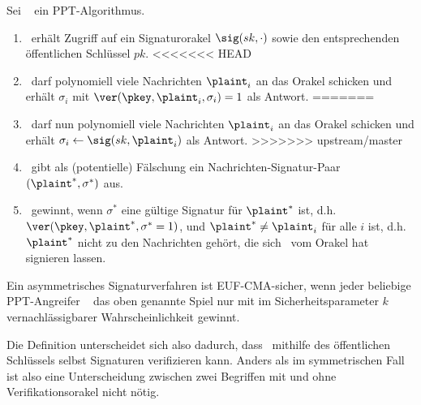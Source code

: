 \begin{definition}
Sei \A~ ein PPT-Algorithmus.
\begin{enumerate}
\item \A~erhält Zugriff auf ein Signaturorakel $\sig(sk, \cdot)$ sowie den
  entsprechenden öffentlichen Schlüssel $pk$.
<<<<<<< HEAD
\item \A~darf polynomiell viele Nachrichten $\plaint_i$ an das
  Orakel schicken und erhält $\sigma_i$ mit $\ver(\pkey, \plaint_i, \sigma_i)=1$ als Antwort.
=======
\item \A~darf nun polynomiell viele Nachrichten $\plaint_i$ an das
  Orakel schicken und erhält $\sigma_i \leftarrow \sig(sk, \plaint_i)$ als Antwort.
>>>>>>> upstream/master
\item \A~gibt als (potentielle) Fälschung ein Nachrichten-Signatur-Paar
  $(\plaint^*,\sigma^*)$ aus.
\item \A~gewinnt, wenn $\sigma^*$ eine gültige Signatur für
  $\plaint^*$ ist, d.h. $\ver(\pkey, \plaint^*, \sigma^* = 1)$, und $\plaint^*
  \neq \plaint_i$ für alle $i$ ist, d.h. $\plaint^*$ nicht zu den
  Nachrichten gehört, die sich \A~vom Orakel hat signieren lassen.
\end{enumerate} 

Ein asymmetrisches Signaturverfahren ist EUF-CMA-sicher, wenn jeder
beliebige PPT-Angreifer \A~ das oben genannte Spiel nur mit im
Sicherheitsparameter $k$ vernachlässigbarer Wahrscheinlichkeit gewinnt. 
\end{definition}

Die Definition unterscheidet sich also dadurch, dass
\A~mithilfe des öffentlichen Schlüssels selbst Signaturen verifizieren kann. Anders
als im symmetrischen Fall ist also eine Unterscheidung zwischen zwei
Begriffen mit und ohne Verifikationsorakel nicht nötig. 

